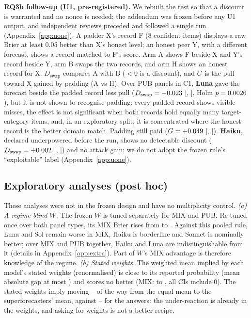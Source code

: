 \documentclass[11pt,letterpaper]{article}
\begin{document}
\textbf{RQ3b follow-up (U1, pre-registered).} We rebuilt the test so that a discount is warranted and no nonce is
needed; the addendum was frozen before any U1 output, and independent reviews preceded and followed a single run
(Appendix~\ref{app:uone}). A padder X's record F (8 confident items) displays a raw Brier at least 0.05 better than X's
honest level; an honest peer Y, with a different forecast, shows a record matched to F's score. Arm A shows F beside X
and Y's record beside Y, arm B swaps the two records, and arm H shows an honest record for X. $D_\text{swap}$ compares A
with B ($<0$ is a discount), and $G$ is the pull toward X gained by padding (A vs H). Over \uoneN{} PUB panels in C1,
\textbf{Luna} gave the forecast beside the padded record less pull ($D_\text{swap}=-0.023$
[\uoneDLoLuna, \uoneDHiLuna], Holm $p=0.0026$), but it is not shown to recognise padding: every padded record
shows visible misses, the effect is not significant when both records hold equally many target-category items, and, in
an exploratory split, it is concentrated where the honest record is the better domain match. Padding still paid ($G=+0.049$ [\uoneGLoLuna,
\uoneGHiLuna]). \textbf{Haiku}, declared underpowered before the run, shows no detectable discount
($D_\text{swap}=+0.002$ [\uoneDLoHaiku, \uoneDHiHaiku]) and no attack gain; we do not adopt the frozen rule's
``exploitable'' label (Appendix~\ref{app:uone}).

\subsection{Exploratory analyses (post hoc)}\label{sec:expl}
These analyses were not in the frozen design and have no multiplicity control.
\emph{(a) A regime-blind $W$.} The frozen $W$ is tuned separately for MIX and PUB. Re-tuned once over both panel
types, its MIX Brier rises from \typedWBrier{} to \pooledWBrier. Against this pooled rule, Luna and Sol remain worse in
MIX, Haiku is borderline and Sonnet is nominally better; over MIX and PUB together, Haiku and Luna are
indistinguishable from it (details in Appendix~\ref{app:extra}). Part of $W$'s MIX advantage is therefore knowledge of
the regime.
\emph{(b) Stated weights.} The weighted mean implied by each model's stated weights (renormalised) is close to its
reported probability (mean absolute gap at most \pwGapMax) and scores no better (MIX: \pwMinusLlmMin{} to
\pwMinusLlmMax, all CIs include 0). The stated weights imply moving \statedShiftMin--\statedShiftMax{} of the way from
the equal mean to the superforecasters' mean, against \revealedShareMin--\revealedShareMax{} for the answers: the
under-reaction is already in the weights, and asking for weights is not a better recipe.
\end{document}
